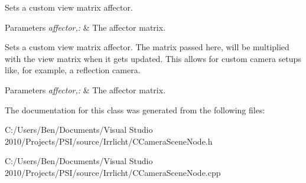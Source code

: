 Sets a custom view matrix affector. 


\begin{DoxyParams}{Parameters}
{\em affector,\-:} & The affector matrix.\\
\hline
\end{DoxyParams}
Sets a custom view matrix affector. The matrix passed here, will be multiplied with the view matrix when it gets updated. This allows for custom camera setups like, for example, a reflection camera. 
\begin{DoxyParams}{Parameters}
{\em affector,\-:} & The affector matrix. \\
\hline
\end{DoxyParams}


The documentation for this class was generated from the following files\-:\begin{DoxyCompactItemize}
\item 
C\-:/\-Users/\-Ben/\-Documents/\-Visual Studio 2010/\-Projects/\-P\-S\-I/source/\-Irrlicht/C\-Camera\-Scene\-Node.\-h\item 
C\-:/\-Users/\-Ben/\-Documents/\-Visual Studio 2010/\-Projects/\-P\-S\-I/source/\-Irrlicht/C\-Camera\-Scene\-Node.\-cpp\end{DoxyCompactItemize}
